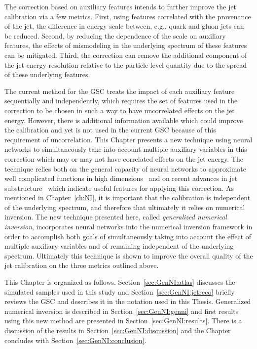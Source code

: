 The correction based on auxiliary features intends to further improve the jet calibration via a few metrics.
First, using features correlated with the provenance of the jet, the difference in energy scale between, e.g., quark and gluon jets can be reduced.
Second, by reducing the dependence of the scale on auxiliary features, the effects of mismodeling in the underlying spectrum of these features can be mitigated.
Third, the correction can remove the additional component of the jet energy resolution relative to the particle-level quantity due to the spread of these underlying features.

The current method for the GSC treats the impact of each auxiliary feature sequentially and independently, which requires the set of features used in the correction to be chosen in such a way to have uncorrelated effects on the jet energy.
However, there is additional information available which could improve the calibration and yet is not used in the current GSC because of this requirement of uncorrelation.
This Chapter presents a new technique using neural networks to simultaneously take into account multiple auxiliary variables in this correction which may or may not have correlated effects on the jet energy.
The technique relies both on the general capacity of neural networks to approximate well complicated functions in high dimensions~\cite{HORNIK1991251} and on recent advances in jet substructure~\cite{Larkoski:2017jix} which indicate useful features for applying this correction.
As mentioned in Chapter~\ref{ch:NI}, it is important that the calibration is independent of the underlying \pt{} spectrum, and therefore that ultimately it relies on numerical inversion.
The new technique presented here, called \textit{generalized numerical inversion}, incorporates neural networks into the numerical inversion framework in order to accomplish both goals of simultaneously taking into account the effect of multiple auxiliary variables and of remaining independent of the underlying spectrum.
Ultimately this technique is shown to improve the overall quality of the jet calibration on the three metrics outlined above.

This Chapter is organized as follows.
Section~\ref{sec:GenNI:atlas} discusses the simulated samples used in this study and Section~\ref{sec:GenNI:jetreco} briefly reviews the GSC and describes it in the notation used in this Thesis.
Generalized numerical inversion is described in Section~\ref{sec:GenNI:genni} and first results using this new method are presented in Section~\ref{sec:GenNI:results}.
There is a discussion of the results in Section~\ref{sec:GenNI:discussion} and the Chapter concludes with Section~\ref{sec:GenNI:conclusion}.

